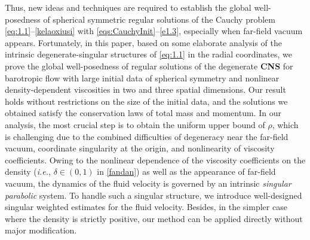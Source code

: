 \documentclass[11pt,reqno]{amsart}
\numberwithin{rk}{section}
\numberwithin{prop}{section}
\numberwithin{mydef}{section}
\numberwithin{lem}{section}
\numberwithin{equation}{section}
\numberwithin{thm}{section}
\begin{document}
Thus, new ideas and techniques are required to establish the global well-posedness of spherical symmetric regular solutions 
of the Cauchy problem \eqref{eq:1.1}--\eqref{kelaoxiusi} with \eqref{eqs:CauchyInit}--\eqref{e1.3}, especially when far-field vacuum appears.
Fortunately, in this paper,  based on some elaborate analysis of the intrinsic degenerate-singular structures of \eqref{eq:1.1} in the radial coordinates, we prove the global well-posedness of regular solutions of the degenerate   \textbf{CNS} for barotropic flow
with large initial data of spherical symmetry and nonlinear density-dependent viscosities in two and three spatial dimensions.  Our result holds without restrictions on the size of the initial data, and the solutions we obtained satisfy the conservation laws of total mass and momentum.
In our analysis, the most crucial step is to obtain the uniform upper bound of $\rho$,  which is challenging due to  the combined difficulties of degeneracy near the far-field vacuum, coordinate singularity at the origin, and nonlinearity of viscosity coefficients. Owing to the nonlinear dependence of the viscosity coefficients on the density (\textit{i.e.}, $\delta\in (0,1)$ in \eqref{fandan}) as well as the appearance of far-field vacuum,  the dynamics of the fluid velocity is governed by an intrinsic {\it singular parabolic} system. To handle such a singular structure, we introduce well-designed singular weighted estimates for the fluid velocity. Besides, in the simpler case where the density is strictly positive, our method can be applied  directly without major modification.
\end{document}
